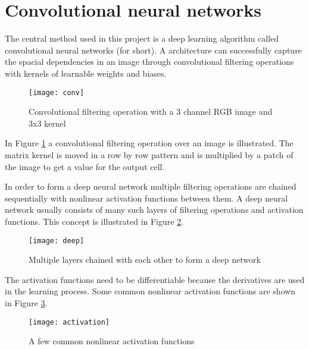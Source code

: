 \section{Convolutional neural networks}

The central method used in this project is a deep learning algorithm called convolutional neural networks (\abbrCNN for short). A \abbrCNN architecture can successfully capture the spacial dependencies in an image through convolutional filtering operations with kernels of learnable weights and biases.

\begin{figure}[H]
	\centering
	\texttt{[image: conv]}
	\caption{Convolutional filtering operation with a 3 channel RGB image and 3x3 kernel}
	\label{fig:conv}
\end{figure}

In Figure \ref{fig:conv} a convolutional filtering operation over an image is illustrated. The matrix kernel is moved in a row by row pattern and is multiplied by a patch of the image to get a value for the output cell.

In order to form a deep neural network multiple filtering operations are chained sequentially with nonlinear activation functions between them. A deep neural network usually consists of many such layers of filtering operations and activation functions. This concept is illustrated in Figure \ref{fig:deep}.

\begin{figure}[H]
	\centering
	\texttt{[image: deep]}
	\caption{Multiple layers chained with each other to form a deep network}
	\label{fig:deep}
\end{figure}

The activation functions need to be differentiable because the derivatives are used in the learning process. Some common nonlinear activation functions are shown in Figure \ref{fig:activation}.

\begin{figure}[H]
	\centering
	\texttt{[image: activation]}
	\caption{A few common nonlinear activation functions}
	\label{fig:activation}
\end{figure}

